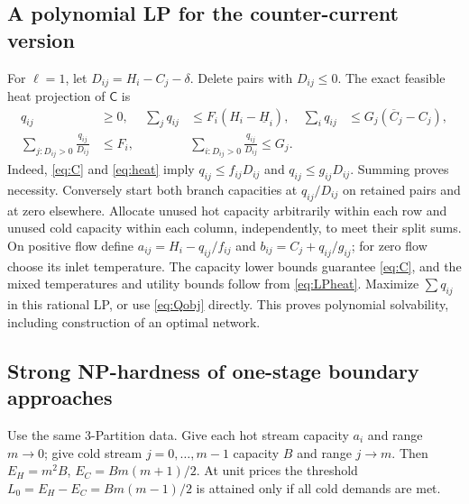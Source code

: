 \documentclass[11pt,a4paper]{report}
\newcommand{\CC}{\mathsf{C}}
\begin{document}
\subsection{A polynomial LP for the counter-current version}
For $\ell=1$, let $D_{ij}=H_i-C_j-\delta$. Delete pairs with $D_{ij}\leq0$.
The exact feasible heat projection of $\CC$ is
\begin{align}
 q_{ij}&\geq0,&
 \sum_jq_{ij}&\leq F_i(H_i-\underline H_i),&
 \sum_iq_{ij}&\leq G_j(\overline C_j-C_j),\label{eq:LPheat}\\
 \sum_{j:D_{ij}>0}\frac{q_{ij}}{D_{ij}}&\leq F_i,&&
 \sum_{i:D_{ij}>0}\frac{q_{ij}}{D_{ij}}\leq G_j.\label{eq:LPflow}
\end{align}
Indeed, \eqref{eq:C} and \eqref{eq:heat} imply $q_{ij}\leq f_{ij}D_{ij}$
and $q_{ij}\leq g_{ij}D_{ij}$. Summing proves necessity. Conversely start
both branch capacities at $q_{ij}/D_{ij}$ on retained pairs and at zero
elsewhere. Allocate unused hot capacity arbitrarily within each row and
unused cold capacity within each column, independently, to meet their split
sums. On positive flow define $a_{ij}=H_i-q_{ij}/f_{ij}$ and
$b_{ij}=C_j+q_{ij}/g_{ij}$; for zero flow choose its inlet temperature.
The capacity lower bounds guarantee \eqref{eq:C}, and the mixed temperatures
and utility bounds follow from \eqref{eq:LPheat}. Maximize $\sum q_{ij}$ in
this rational LP, or use \eqref{eq:Qobj} directly. This proves polynomial
solvability, including construction of an optimal network.

\subsection{Strong NP-hardness of one-stage boundary approaches}
Use the same 3-Partition data. Give each hot stream capacity $a_i$ and range
$m\to0$; give cold stream $j=0,\ldots,m-1$ capacity $B$ and range $j\to m$.
Then $E_H=m^2B$, $E_C=Bm(m+1)/2$. At unit prices the threshold
$L_0=E_H-E_C=Bm(m-1)/2$ is attained only if all cold demands are met.
\end{document}
